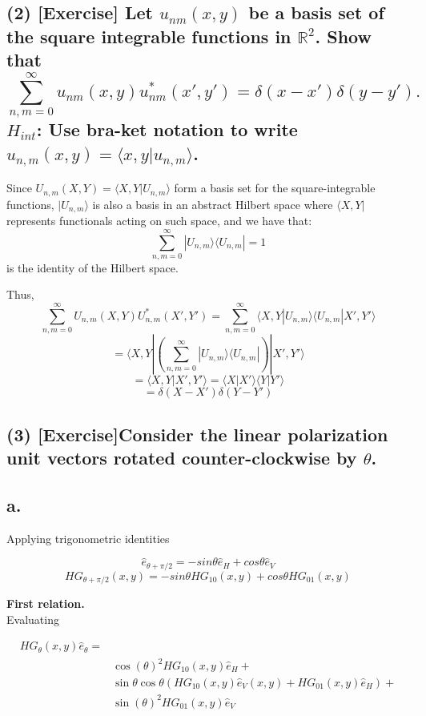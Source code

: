 \documentclass[12pt]{article}
\begin{document}
\begin{flushleft}
\subsection*{(2) [Exercise] Let \( u_{nm}(x, y) \) be a basis set of the square integrable functions in \( \mathbb{R}^2 \). Show that
 \[
    \sum_{n,m=0}^{\infty} u_{nm}(x, y) u_{nm}^*(x', y') = \delta(x - x') \delta(y - y').
    \tag{19}
    \]
    \(H_{int}\): Use bra-ket notation to write \( u_{n,m}(x, y) = \langle x, y | u_{n,m} \rangle \).}


Since \( U_{n,m}(X,Y) = \langle X,Y | U_{n,m} \rangle \) form a basis set for the square-integrable functions, \( |U_{n,m}\rangle \) is also a basis in an abstract Hilbert space where \( \langle X,Y | \) represents functionals acting on such space, and we have that:
\[
\sum_{n,m=0}^{\infty} | U_{n,m} \rangle \langle U_{n,m} | = 1
\]
is the identity of the Hilbert space.

Thus,
\[
\sum_{n,m=0}^{\infty} U_{n,m}(X,Y) U_{n,m}^*(X',Y') = \sum_{n,m=0}^{\infty} \langle X,Y | U_{n,m} \rangle \langle U_{n,m} | X',Y' \rangle
\]
\[
= \langle X,Y | \left( \sum_{n,m=0}^{\infty} | U_{n,m} \rangle \langle U_{n,m} | \right) | X',Y' \rangle
\]
\[
= \langle X,Y | X',Y' \rangle = \langle X | X' \rangle \langle Y | Y' \rangle
\]
\[
=\delta(X-X') \delta(Y-Y')
\]

\subsection*{(3) [Exercise]Consider the linear polarization unit vectors rotated counter-clockwise by $\theta$.}

\subsection*{a.}

Applying trigonometric identities

\[
    \hat{e}_{\theta+\pi/2} = -sin\theta \hat{e}_H + cos\theta \hat{e}_V
\]
\[
    HG_{\theta+\pi/2}(x,y) = -sin\theta HG_{10}(x,y) + cos\theta HG_{01}(x,y)
\]


\textbf{First relation.}\\
Evaluating

    \begin{align*}
     HG_{\theta}(x,y)\hat{e}_{\theta}=&\\
        &\cos(\theta)^2HG_{10}(x,y)\hat{e}_{H}+\\
        &\sin{\theta}\cos{\theta}(HG_{10}(x,y)\hat{e}_{V}(x,y)+HG_{01}(x,y)\hat{e}_{H})+\\
        &\sin(\theta)^2HG_{01}(x,y)\hat{e}_{V}
    \end{align*}


\end{flushleft}
\end{document}
